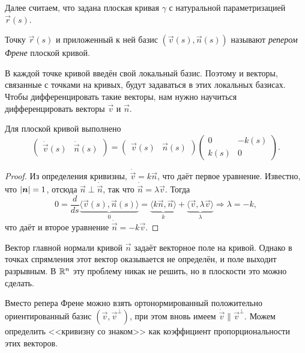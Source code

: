 Далее считаем, что задана плоская кривая $\gamma$ с натуральной параметризацией $\vec{r}(s)$.

\begin{definition}
	Точку $\vec{r}(s)$ и приложенный к ней базис $(\vec{v}(s), \vec{n}(s))$ называют \textit{репером Френе} плоской кривой.
\end{definition}

В каждой точке кривой введён свой локальный базис. Поэтому и векторы, связанные с точками на кривых, будут задаваться в этих локальных базисах. Чтобы дифференцировать такие векторы, нам нужно научиться дифференцировать векторы $\vec{v}$ и $\vec{n}$.

\begin{theorem}
	Для плоской кривой выполнено
	\begin{equation} \label{eq:PlaneFrenet}
		\begin{pmatrix}
			\dot{\vec{v}}(s) & \dot{\vec{n}}(s)
		\end{pmatrix} = 
		\begin{pmatrix}
			\vec{v}(s) & \vec{n}(s)
		\end{pmatrix}
		\begin{pmatrix}
			0 & -k(s)\\
			k(s) & 0
		\end{pmatrix}.
	\end{equation}
\end{theorem}

\begin{proof}
	Из определения кривизны, $\dot{\vec{v}} = k\vec{n}$, что даёт первое уравнение. Известно, что $\left\lvert\boldsymbol{n}\right\rvert = 1$, отсюда $\vec{n} \perp \dot{\vec{n}}$, так что $\dot{\vec{n}} = \lambda\vec{v}$. Тогда
	\[
		0 = \frac{d}{ds}\underbrace{\langle \vec{v}(s), \vec{n}(s)\rangle}_{0} = \underbrace{\langle k\vec{n}, \vec{n}\rangle}_{k} + \underbrace{\langle \vec{v}, \lambda\vec{v} \rangle}_{\lambda} \Rightarrow \lambda = -k,
	\]
	что даёт и второе уравнение $\dot{\vec{n}} = -k\vec{v}$.
\end{proof}

Вектор главной нормали кривой $\vec{n}$ задаёт векторное поле на кривой. Однако в точках спрямления этот вектор оказывается не определён, и поле выходит разрывным. В $\mathbb{R}^n$ эту проблему никак не решить, но в плоскости это можно сделать.

Вместо репера Френе можно взять ортонормированный положительно ориентированный базис $(\vec{v}, \vec{v}^{\perp})$, при этом вновь имеем $\dot{\vec{v}} \parallel \vec{v}^{\perp}$. Можем определить <<кривизну со знаком>> как коэффициент пропорциональности этих векторов.

